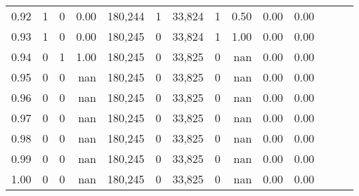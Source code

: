 \begin{tabular}{rrrrrrrrrrrrrr}
0.92 &      1 &    0 &  0.00 &  180,244 &        1 &  33,824 &       1 &  0.50 &  0.00 &      0.00 \\
0.93 &      1 &    0 &  0.00 &  180,245 &        0 &  33,824 &       1 &  1.00 &  0.00 &      0.00 \\
0.94 &      0 &    1 &  1.00 &  180,245 &        0 &  33,825 &       0 &   nan &  0.00 &      0.00 \\
0.95 &      0 &    0 &   nan &  180,245 &        0 &  33,825 &       0 &   nan &  0.00 &      0.00 \\
0.96 &      0 &    0 &   nan &  180,245 &        0 &  33,825 &       0 &   nan &  0.00 &      0.00 \\
0.97 &      0 &    0 &   nan &  180,245 &        0 &  33,825 &       0 &   nan &  0.00 &      0.00 \\
0.98 &      0 &    0 &   nan &  180,245 &        0 &  33,825 &       0 &   nan &  0.00 &      0.00 \\
0.99 &      0 &    0 &   nan &  180,245 &        0 &  33,825 &       0 &   nan &  0.00 &      0.00 \\
1.00 &      0 &    0 &   nan &  180,245 &        0 &  33,825 &       0 &   nan &  0.00 &      0.00 \\
\bottomrule
\end{tabular}
